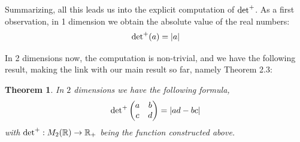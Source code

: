 \documentclass[12pt]{amsbook}
\newtheorem{theorem}{Theorem}[chapter]
\begin{document}
Summarizing, all this leads us into the explicit computation of ${\rm det}^+$. As a first observation, in 1 dimension we obtain the absolute value of the real numbers:
$${\rm det}^+(a)=|a|$$

In 2 dimensions now, the computation is non-trivial, and we have the following result, making the link with our main result so far, namely Theorem 2.3:

\begin{theorem}
In $2$ dimensions we have the following formula,
$${\rm det}^+\begin{pmatrix}a&b\\ c&d\end{pmatrix}=|ad-bc|$$
with ${\rm det}^+:M_2(\mathbb R)\to\mathbb R_+$ being the function constructed above.
\end{theorem}
\end{document}
